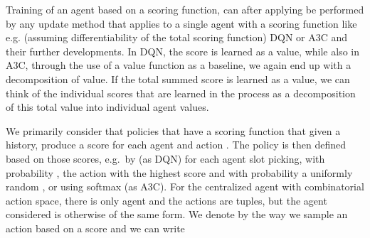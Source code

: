 \documentclass{article}
\begin{document}
\begin{SCfigure}
\iffalse
\subsubsection{Policies and Scoring Functions}


More generally this technique can be applied to situations where a policy is derived from any other \emph{scoring function}  which, given a history, produces a score for each agent and action , such that the policy is then defined based on those scores rather than a -function. Given a scoring function , and a composition function , we can compose them by letting  and we write . (We are particularly considering .) For instance policy gradient networks would output a probability distribution over actions in any given state, effectively deriving a policy using a softmax of a score, and in that case the log-probability can be considered a such a scoring function. In this way the technique we described above is readily applicable to multi-agent learning using A3C, for instance.


Note that, while we talk about one scoring function , this is a special case of the form  where each  is a scoring function for an individual agent. If each is trained individually, we are simply training independent agents, while if we use a  to combine the individual scores into a total score that is trained as one agent, we are performing centralized training to achieve coordinated individual agents.
\fi


\iffalse
Training of an agent based on a scoring function, can after applying  be performed  by any update method that applies to a single agent with a scoring function like e.g. (assuming differentiability of the total scoring function) DQN or A3C and their further developments. In DQN, the score is learned as a value, while also in A3C, through the use of a value function as a baseline, we again end up with a decomposition of value. If the total summed score is learned as a value, we can think of the individual scores that are learned in the process as a decomposition of this total value into individual agent values.

We primarily consider that policies that have a scoring function  that given a history, produce a score for each agent and action . The policy is then defined based on those scores, e.g.\ by (as DQN) for each agent slot  picking, with probability , the action  with the highest score and with probability  a uniformly random , or using softmax (as A3C). For the centralized agent with combinatorial action space, there is only agent  and the actions are tuples, but the agent considered is otherwise of the same form. We denote by  the way we sample an action based on a score and we can write


\end{SCfigure}
\end{document}
